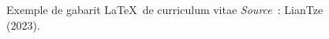 \documentclass[
  letterpaper,
  DIV=11,
  numbers=noendperiod]{scrreprt}
\begin{document}
\begin{figure}


\caption{\label{fig-cv}Exemple de gabarit \LaTeX~de curriculum vitae
\newline \textit{Source}~: LianTze (2023).}

\end{figure}%
\end{document}
